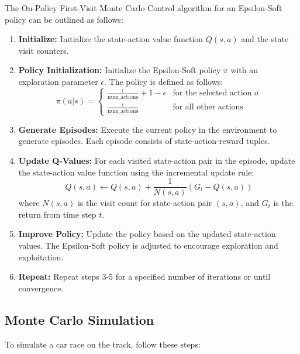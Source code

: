\documentclass{article}
\begin{document}
The On-Policy First-Visit Monte Carlo Control algorithm for an Epsilon-Soft policy can be outlined as follows:

\begin{enumerate}
    \item \textbf{Initialize:} Initialize the state-action value function \(Q(s, a)\) and the state visit counters.
    
    \item \textbf{Policy Initialization:} Initialize the Epsilon-Soft policy \(\pi\) with an exploration parameter \(\epsilon\). The policy is defined as follows:
    \[
    \pi(a|s) = \begin{cases} 
      \frac{\epsilon}{\text{{num\_actions}}} + 1 - \epsilon & \text{for the selected action } a \\
      \frac{\epsilon}{\text{{num\_actions}}} & \text{for all other actions}
   \end{cases}
    \]
    
    \item \textbf{Generate Episodes:} Execute the current policy in the environment to generate episodes. Each episode consists of state-action-reward tuples.

    \item \textbf{Update Q-Values:} For each visited state-action pair in the episode, update the state-action value function using the incremental update rule:
    \[
    Q(s, a) \leftarrow Q(s, a) + \frac{1}{N(s, a)}(G_t - Q(s, a))
    \]
    where \(N(s, a)\) is the visit count for state-action pair \((s, a)\), and \(G_t\) is the return from time step \(t\).

    \item \textbf{Improve Policy:} Update the policy based on the updated state-action values. The Epsilon-Soft policy is adjusted to encourage exploration and exploitation.

    \item \textbf{Repeat:} Repeat steps 3-5 for a specified number of iterations or until convergence.

\end{enumerate}

\subsection{Monte Carlo Simulation}
To simulate a car race on the track, follow these steps:
\end{document}
